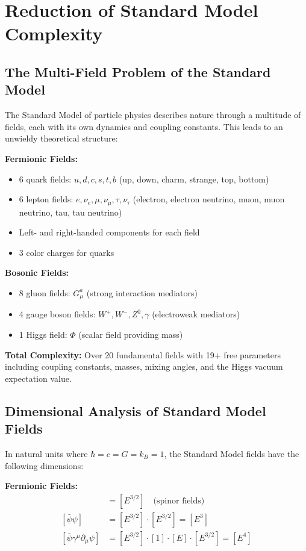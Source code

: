 \documentclass[12pt,a4paper]{report}
\newcommand{\natunits}{\hbar = c = G = k_B = 1} %
\begin{document}
	\section{Reduction of Standard Model Complexity}
	\label{sec:sm_complexity}
	
	\subsection{The Multi-Field Problem of the Standard Model}
	\label{subsec:multifield_problem}
	
	The Standard Model of particle physics describes nature through a multitude of fields, each with its own dynamics and coupling constants. This leads to an unwieldy theoretical structure:
	
	\textbf{Fermionic Fields:}
	\begin{itemize}
		\item 6 quark fields: $u, d, c, s, t, b$ (up, down, charm, strange, top, bottom)
		\item 6 lepton fields: $e, \nu_e, \mu, \nu_\mu, \tau, \nu_\tau$ (electron, electron neutrino, muon, muon neutrino, tau, tau neutrino)
		\item Left- and right-handed components for each field
		\item 3 color charges for quarks
	\end{itemize}
	
	\textbf{Bosonic Fields:}
	\begin{itemize}
		\item 8 gluon fields: $G_\mu^a$ (strong interaction mediators)
		\item 4 gauge boson fields: $W^+, W^-, Z^0, \gamma$ (electroweak mediators)
		\item 1 Higgs field: $\Phi$ (scalar field providing mass)
	\end{itemize}
	
	\textbf{Total Complexity:}
	Over 20 fundamental fields with 19+ free parameters including coupling constants, masses, mixing angles, and the Higgs vacuum expectation value.
	
	\subsection{Dimensional Analysis of Standard Model Fields}
	
	In natural units where $\natunits$, the Standard Model fields have the following dimensions:
	
	\textbf{Fermionic Fields:}
	\begin{align}
		[\psi_{\text{fermion}}] &= [E^{3/2}] \quad \text{(spinor fields)} \\
		[\bar{\psi}\psi] &= [E^{3/2}] \cdot [E^{3/2}] = [E^3] \\
		[\bar{\psi}\gamma^\mu\partial_\mu\psi] &= [E^{3/2}] \cdot [1] \cdot [E] \cdot [E^{3/2}] = [E^4]
	\end{align}
	
\end{document}
